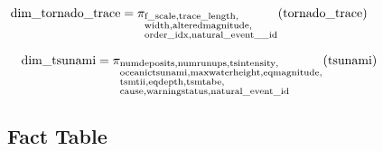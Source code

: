 \documentclass{article}
\begin{document}
\begin{align*}
\hspace{-2.2cm} \text{dim\_tornado\_trace} &= \pi_{\begin{subarray}{l}
                    \text{f\_scale}, 
                    \text{trace\_length}, \\
                    \text{width}, 
                    \text{alteredmagnitude},\\ 
                    \text{order\_idx}, 
                    \text{natural\_event\_\_id}
                   \end{subarray}} (\text{tornado\_trace})
\end{align*}

\begin{align*}
\hspace{-1.6cm} \text{dim\_tsunami} &= \pi_{\begin{subarray}{l\\}
   \text{numdeposits}, 
   \text{numrunups}, 
   \text{tsintensity},\\ 
   \text{oceanictsunami}, 
   \text{maxwaterheight}, 
   \text{eqmagnitude}, \\
   \text{tsmtii}, 
   \text{eqdepth}, 
   \text{tsmtabe}, \\
   \text{cause}, 
   \text{warningstatus}, 
   \text{natural\_event\_id}
\end{subarray}} (\text{tsunami})
\end{align*}

\subsection{Fact Table}
\end{document}

